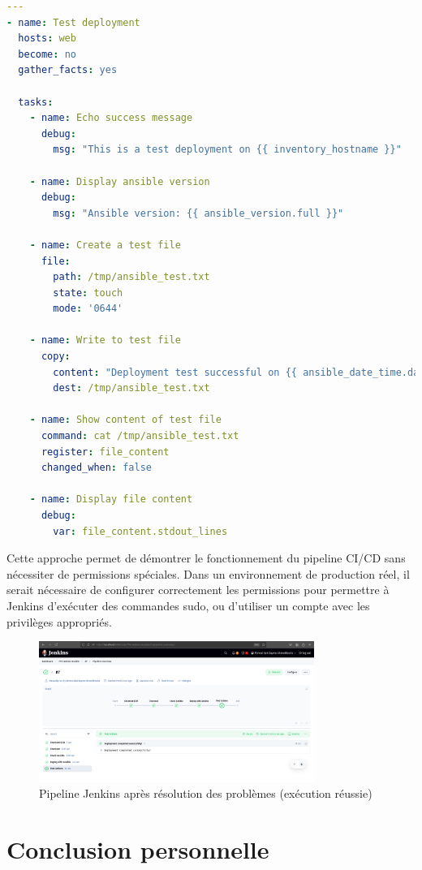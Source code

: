 \documentclass{article}
\begin{document}
\begin{lstlisting}[language=yaml]
---
- name: Test deployment 
  hosts: web
  become: no
  gather_facts: yes
  
  tasks:
    - name: Echo success message
      debug:
        msg: "This is a test deployment on {{ inventory_hostname }}"

    - name: Display ansible version
      debug:
        msg: "Ansible version: {{ ansible_version.full }}"

    - name: Create a test file
      file:
        path: /tmp/ansible_test.txt
        state: touch
        mode: '0644'

    - name: Write to test file
      copy:
        content: "Deployment test successful on {{ ansible_date_time.date }} at {{ ansible_date_time.time }}"
        dest: /tmp/ansible_test.txt

    - name: Show content of test file
      command: cat /tmp/ansible_test.txt
      register: file_content
      changed_when: false

    - name: Display file content
      debug:
        var: file_content.stdout_lines
\end{lstlisting}

Cette approche permet de démontrer le fonctionnement du pipeline CI/CD sans nécessiter de permissions spéciales. Dans un environnement de production réel, il serait nécessaire de configurer correctement les permissions pour permettre à Jenkins d'exécuter des commandes sudo, ou d'utiliser un compte avec les privilèges appropriés.

\begin{figure}[h]
    \centering
    \includegraphics[width=0.8\textwidth]{images/jenkins_pipeline_success.png}
    \caption{Pipeline Jenkins après résolution des problèmes (exécution réussie)}
    \label{fig:jenkins_pipeline_success}
\end{figure}

\section{Conclusion personnelle}
\end{document}
